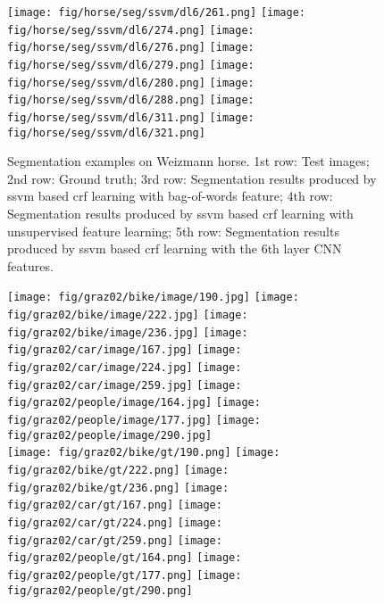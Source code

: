 \documentclass[10pt,3p]{elsarticle}
\newcommand{\ssvm}{{\sc ssvm}\xspace}
\newcommand{\crf}{{\sc crf}\xspace}
\begin{document}
\begin{figure}[t]
     \texttt{[image: fig/horse/seg/ssvm/dl6/261.png]}
     \texttt{[image: fig/horse/seg/ssvm/dl6/274.png]}
     \texttt{[image: fig/horse/seg/ssvm/dl6/276.png]}       
	\texttt{[image: fig/horse/seg/ssvm/dl6/279.png]}                  
    \texttt{[image: fig/horse/seg/ssvm/dl6/280.png]}
     \texttt{[image: fig/horse/seg/ssvm/dl6/288.png]}  
     \texttt{[image: fig/horse/seg/ssvm/dl6/311.png]}   
     \texttt{[image: fig/horse/seg/ssvm/dl6/321.png]} \\

\caption{Segmentation examples on Weizmann horse. 1st row: Test images; 2nd row: Ground truth; 
3rd row: Segmentation results produced by \ssvm based \crf learning with bag-of-words feature;
4th row: Segmentation results produced by \ssvm based \crf learning with unsupervised feature learning;
5th row: Segmentation results produced by \ssvm based \crf learning with the 6th layer CNN features. }
\label{fig:seg_horse}     
\end{figure}\begin{figure}[t]
\centering
    \texttt{[image: fig/graz02/bike/image/190.jpg]}
     \texttt{[image: fig/graz02/bike/image/222.jpg]}
     \texttt{[image: fig/graz02/bike/image/236.jpg]}       
	\texttt{[image: fig/graz02/car/image/167.jpg]}                  
    \texttt{[image: fig/graz02/car/image/224.jpg]}
     \texttt{[image: fig/graz02/car/image/259.jpg]}  
     \texttt{[image: fig/graz02/people/image/164.jpg]}   
     \texttt{[image: fig/graz02/people/image/177.jpg]} 
     \texttt{[image: fig/graz02/people/image/290.jpg]} \\
     
     \texttt{[image: fig/graz02/bike/gt/190.png]}
     \texttt{[image: fig/graz02/bike/gt/222.png]}
     \texttt{[image: fig/graz02/bike/gt/236.png]}       
	\texttt{[image: fig/graz02/car/gt/167.png]}                  
    \texttt{[image: fig/graz02/car/gt/224.png]}
     \texttt{[image: fig/graz02/car/gt/259.png]}  
     \texttt{[image: fig/graz02/people/gt/164.png]}   
     \texttt{[image: fig/graz02/people/gt/177.png]} 
     \texttt{[image: fig/graz02/people/gt/290.png]} \\
     

\end{figure}
\end{document}
